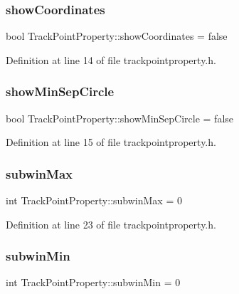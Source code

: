\subsubsection{\texorpdfstring{showCoordinates}{showCoordinates}}
{\footnotesize\ttfamily bool Track\+Point\+Property\+::show\+Coordinates = false}



Definition at line 14 of file trackpointproperty.\+h.

\mbox{\label{struct_track_point_property_a57ec7d62e1d69c0f8daeb0ca34b1a8b6}} 
\subsubsection{\texorpdfstring{showMinSepCircle}{showMinSepCircle}}
{\footnotesize\ttfamily bool Track\+Point\+Property\+::show\+Min\+Sep\+Circle = false}



Definition at line 15 of file trackpointproperty.\+h.

\mbox{\label{struct_track_point_property_a420b24aa71b3809f1d61b869a7fb918b}} 
\subsubsection{\texorpdfstring{subwinMax}{subwinMax}}
{\footnotesize\ttfamily int Track\+Point\+Property\+::subwin\+Max = 0}



Definition at line 23 of file trackpointproperty.\+h.

\mbox{\label{struct_track_point_property_af508bb3787b679fe1c63553d91fea927}} 
\subsubsection{\texorpdfstring{subwinMin}{subwinMin}}
{\footnotesize\ttfamily int Track\+Point\+Property\+::subwin\+Min = 0}



